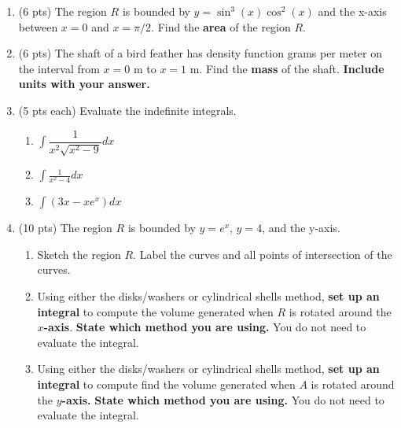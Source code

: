 \documentclass[12pt]{article}
\renewcommand{\emph}[1]{\textsf{\textbf{#1}}}
\begin{document}
\newpage
\begin{enumerate}
\item (6 pts) The region $R$ is bounded by $ y = \sin^3 (x) \cos^2 (x) $ and the x-axis between $x = 0$ and $ x = \pi/2$.  Find the \textbf{area} of the region $R.$

\vfill



\newpage
\item (6 pts) The shaft of a bird feather has density function  grams per meter on the interval from $x=0$ m to $x=1$ m. Find the \emph{mass} of the shaft. \emph{Include units with your answer.}
\vfill

\item (5 pts each) Evaluate the indefinite integrals. 
	\begin{enumerate}
	\item $\displaystyle \int \dfrac{1}{x^2\sqrt{x^2-9}} dx $
	\vfill
\newpage
	\item $\displaystyle \int \frac{1}{x^2-4} dx$
	\vfill
	\item $\displaystyle \int (3x-xe^x ) dx$
	\vfill
	\end{enumerate}

\newpage


\item (10 pts) The region $R$ is bounded by $y= e^x$, $y=4$, and the y-axis.
\begin{enumerate}
\item Sketch the region $R.$ Label the curves and all points of intersection of the curves.
\vfill
\item Using either the disks/washers or cylindrical shells method, \emph{set up an integral} to compute the volume generated when $R$ is rotated around the \textbf{$x$-axis}. \emph{State which method you are using.} You do not need to evaluate the integral.
\vfill
\item Using either the disks/washers or cylindrical shells method, \emph{set up an integral} to compute find the volume generated when $A$ is rotated around the \textbf{$y$-axis.} \emph{State which method you are using.} You do not need to evaluate the integral.
\vfill
\end{enumerate}



\end{enumerate}
\end{document}
